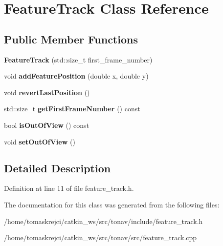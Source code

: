 \hypertarget{class_feature_track}{\section{Feature\-Track Class Reference}
\label{class_feature_track}
}
\subsection*{Public Member Functions}
\begin{DoxyCompactItemize}
\item 
\hypertarget{class_feature_track_ade7f659359480dab8f8ec7ace7625467}{{\bfseries Feature\-Track} (std\-::size\-\_\-t first\-\_\-frame\-\_\-number)}\label{class_feature_track_ade7f659359480dab8f8ec7ace7625467}

\item 
\hypertarget{class_feature_track_a5f13b226ac16fb0c9abe692c17f0f0c6}{void {\bfseries add\-Feature\-Position} (double x, double y)}\label{class_feature_track_a5f13b226ac16fb0c9abe692c17f0f0c6}

\item 
\hypertarget{class_feature_track_aa21cd2b1af1f2aaea1e7d19631f80474}{void {\bfseries revert\-Last\-Position} ()}\label{class_feature_track_aa21cd2b1af1f2aaea1e7d19631f80474}

\item 
\hypertarget{class_feature_track_a1635683732cdfda103a37d926d2efbf9}{std\-::size\-\_\-t {\bfseries get\-First\-Frame\-Number} () const }\label{class_feature_track_a1635683732cdfda103a37d926d2efbf9}

\item 
\hypertarget{class_feature_track_a966f8f018b7305d764216880f4a6f8ba}{bool {\bfseries is\-Out\-Of\-View} () const }\label{class_feature_track_a966f8f018b7305d764216880f4a6f8ba}

\item 
\hypertarget{class_feature_track_a75a507f6ac11d3a9319523d131c7949d}{void {\bfseries set\-Out\-Of\-View} ()}\label{class_feature_track_a75a507f6ac11d3a9319523d131c7949d}

\end{DoxyCompactItemize}


\subsection{Detailed Description}


Definition at line 11 of file feature\-\_\-track.\-h.



The documentation for this class was generated from the following files\-:\begin{DoxyCompactItemize}
\item 
/home/tomaskrejci/catkin\-\_\-ws/src/tonav/include/feature\-\_\-track.\-h\item 
/home/tomaskrejci/catkin\-\_\-ws/src/tonav/src/feature\-\_\-track.\-cpp\end{DoxyCompactItemize}
